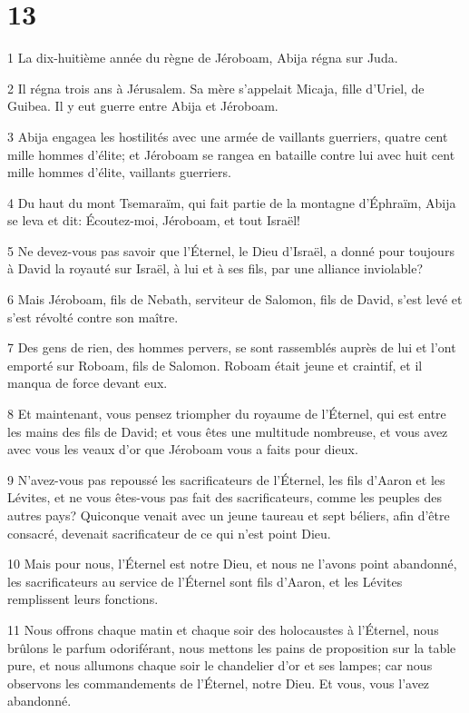 \chapter{13}

\par 1 La dix-huitième année du règne de Jéroboam, Abija régna sur Juda.
\par 2 Il régna trois ans à Jérusalem. Sa mère s'appelait Micaja, fille d'Uriel, de Guibea. Il y eut guerre entre Abija et Jéroboam.
\par 3 Abija engagea les hostilités avec une armée de vaillants guerriers, quatre cent mille hommes d'élite; et Jéroboam se rangea en bataille contre lui avec huit cent mille hommes d'élite, vaillants guerriers.
\par 4 Du haut du mont Tsemaraïm, qui fait partie de la montagne d'Éphraïm, Abija se leva et dit: Écoutez-moi, Jéroboam, et tout Israël!
\par 5 Ne devez-vous pas savoir que l'Éternel, le Dieu d'Israël, a donné pour toujours à David la royauté sur Israël, à lui et à ses fils, par une alliance inviolable?
\par 6 Mais Jéroboam, fils de Nebath, serviteur de Salomon, fils de David, s'est levé et s'est révolté contre son maître.
\par 7 Des gens de rien, des hommes pervers, se sont rassemblés auprès de lui et l'ont emporté sur Roboam, fils de Salomon. Roboam était jeune et craintif, et il manqua de force devant eux.
\par 8 Et maintenant, vous pensez triompher du royaume de l'Éternel, qui est entre les mains des fils de David; et vous êtes une multitude nombreuse, et vous avez avec vous les veaux d'or que Jéroboam vous a faits pour dieux.
\par 9 N'avez-vous pas repoussé les sacrificateurs de l'Éternel, les fils d'Aaron et les Lévites, et ne vous êtes-vous pas fait des sacrificateurs, comme les peuples des autres pays? Quiconque venait avec un jeune taureau et sept béliers, afin d'être consacré, devenait sacrificateur de ce qui n'est point Dieu.
\par 10 Mais pour nous, l'Éternel est notre Dieu, et nous ne l'avons point abandonné, les sacrificateurs au service de l'Éternel sont fils d'Aaron, et les Lévites remplissent leurs fonctions.
\par 11 Nous offrons chaque matin et chaque soir des holocaustes à l'Éternel, nous brûlons le parfum odoriférant, nous mettons les pains de proposition sur la table pure, et nous allumons chaque soir le chandelier d'or et ses lampes; car nous observons les commandements de l'Éternel, notre Dieu. Et vous, vous l'avez abandonné.
